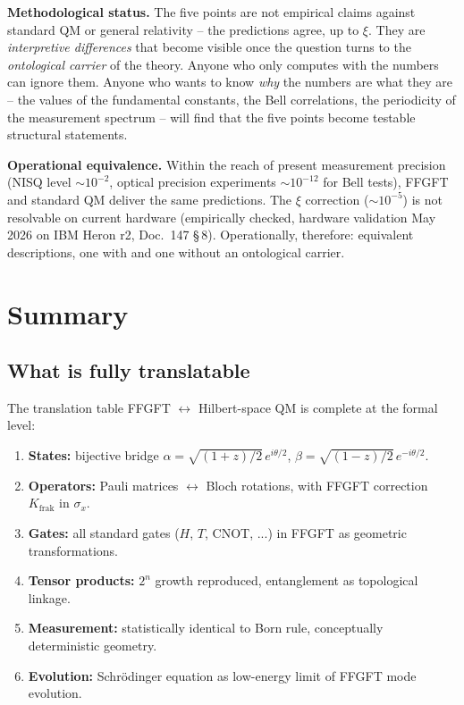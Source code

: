 \textbf{Methodological status.} The five points are not empirical
claims against standard QM or general relativity -- the predictions
agree, up to $\xi$. They are \emph{interpretive differences} that
become visible once the question turns to the \emph{ontological
carrier} of the theory. Anyone who only computes with the numbers can
ignore them. Anyone who wants to know \emph{why} the numbers are what
they are -- the values of the fundamental constants, the Bell
correlations, the periodicity of the measurement spectrum -- will
find that the five points become testable structural statements.

\textbf{Operational equivalence.} Within the reach of present
measurement precision (NISQ level $\sim 10^{-2}$, optical
precision experiments $\sim 10^{-12}$ for Bell tests), FFGFT and
standard QM deliver the same predictions. The $\xi$ correction
($\sim 10^{-5}$) is not resolvable on current hardware (empirically
checked, hardware validation May 2026 on IBM Heron r2, Doc.~147 §\,8).
Operationally, therefore: equivalent descriptions, one with and one
without an ontological carrier.

\section{Summary}

\subsection*{What is fully translatable}

The translation table FFGFT $\leftrightarrow$ Hilbert-space QM is
complete at the formal level:

\begin{enumerate}[leftmargin=2em,itemsep=2pt,topsep=2pt]
  \item \textbf{States:} bijective bridge
        $\alpha = \sqrt{(1+z)/2}\,e^{i\theta/2}$,
        $\beta = \sqrt{(1-z)/2}\,e^{-i\theta/2}$.
  \item \textbf{Operators:} Pauli matrices $\leftrightarrow$ Bloch
        rotations, with FFGFT correction $K_{\text{frak}}$ in
        $\sigma_x$.
  \item \textbf{Gates:} all standard gates ($H$, $T$, CNOT, ...) in
        FFGFT as geometric transformations.
  \item \textbf{Tensor products:} $2^n$ growth reproduced,
        entanglement as topological linkage.
  \item \textbf{Measurement:} statistically identical to Born rule,
        conceptually deterministic geometry.
  \item \textbf{Evolution:} Schrödinger equation as low-energy limit
        of FFGFT mode evolution.
\end{enumerate}

